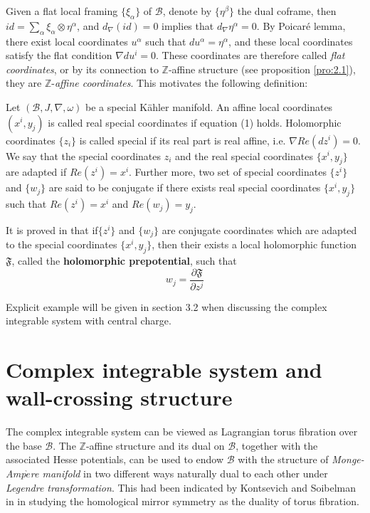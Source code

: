 \documentclass{article}
\begin{document}
Given a flat local framing $\{\xi_{\alpha}\}$ of $\mathcal{B}$, denote by $\{\eta^{\beta}\}$ the dual coframe, then $id=\sum_{\alpha}\xi_{\alpha}\otimes\eta^{\alpha}$, and $d_{\nabla}(id)=0$ implies that $d_{\nabla}\eta^{\alpha}=0$. By Poicar\'e lemma, there exist local coordinates $u^{\alpha}$ such that $du^{\alpha}=\eta^{\alpha}$, and these local coordinates satisfy the flat condition $\nabla du^{i}=0$. These coordinates are therefore called \textit{flat coordinates}, or by its connection to $\mathbb{Z}$-affine structure (see proposition \ref{pro:2.1}), they are $\mathbb{Z}$-\textit{affine coordinates}. This motivates the following definition:
 
 \begin{definition}\label{def:2.4}
 Let $(\mathcal{B},J,\nabla,\omega)$ be a special K\"ahler manifold. An affine local coordinates $(x^{i},y_{j})$ is called real special coordinates if equation (1) holds. Holomorphic coordinates $\{z_{i}\}$ is called special if its real part is real affine, i.e. $\nabla Re(dz^{i})=0$. We say that the special coordinates $z_{i}$ and the real special coordinates $\{x^{i},y_{j}\}$ are adapted if $Re(z^{i})=x^{i}$. Further more, two set of special coordinates $\{z^{i}\}$ and $\{w_{j}\}$ are said to be conjugate if there exists real special coordinates $\{x^{i},y_{j}\}$ such that $Re(z^{i})=x^{i}$ and $Re(w_{j})=y_{j}$.
\end{definition}
 
It is proved in \cite{freed1999special} that if$\{z^{i}\}$ and $\{w_{j}\}$ are conjugate coordinates which are adapted to the special coordinates $\{x^{i},y_{j}\}$, then their exists a local holomorphic function $\mathfrak{F}$, called the \textbf{holomorphic prepotential}, such that 
\begin{equation}
w_{j}=\frac{\partial\mathfrak{F}}{\partial z^{j}}
\end{equation}

 Explicit example will be given  in section 3.2 when discussing the complex integrable system with central charge.

\section{Complex integrable system and wall-crossing structure}\label{sec:3}

The complex integrable system can be viewed as Lagrangian torus fibration over the base $\mathcal{B}$. The $\mathbb{Z}$-affine structure and its dual on $\mathcal{B}$, together with the associated Hesse potentials, can be used to endow $\mathcal{B}$ with the structure of \textit{Monge-Amp$\grave{e}$re manifold} in two different ways naturally dual to each other under \textit{Legendre transformation}. This had been indicated by Kontsevich and Soibelman in \cite{kontsevich2001homological} in studying the homological mirror symmetry as the duality of torus fibration. 
\end{document}
